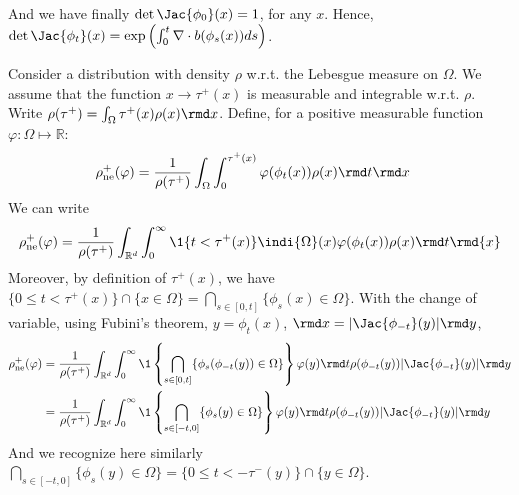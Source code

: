 And we have finally $ \det \Jac{\phi_0}(x) = 1$, for any $x$. Hence, $\det \Jac{\phi_t} (x) = \exp \left(\int_{0}^{t} \nabla \cdot b(\phi_s(x)) d s\right)$.


Consider a distribution with density $\rho$ w.r.t. the Lebesgue measure on $\Omega$. We assume that the function $x \to \tau^+(x)$ is measurable and integrable w.r.t. $\rho$.
Write $\rho(\tau^{+}) = \int_\Omega \tau^+(x) \rho(x) \rmd x$. 
Define, for a positive measurable function $\varphi:\Omega\mapsto \mathbb{R}$:
\begin{align*}
 \rho_{\mathrm{ne}}^{+}(\varphi) &=\frac{1}{\rho(\tau^{+})} \int_{\Omega} \int_{0}^{\tau^{+}({x})} \varphi(\phi_t(x))\rho({x})  \rmd t \rmd x 
\end{align*}
We can write
\begin{align*}
\rho_{\mathrm{ne}}^{+}(\varphi)  &=\frac{1}{\rho(\tau^{+})} \int_{\mathbb{R}^{d}} \int_{0}^{\infty}\1\{t< \tau^{+}( {x})\}\indi{\Omega}(x) \varphi(\phi_t(x))  \rho( {x}) \rmd t \rmd {x} \\
\end{align*}
Moreover, by definition of $\tau^{+}( {x})$, we have $\{0\leq t< \tau^{+}( {x})\}\cap\{x \in \Omega\} = \bigcap_{s \in [0,t]}\{\phi_s(x) \in \Omega\}$.
With the change of variable, using Fubini's theorem, $y = \phi_t(x)$, $\rmd x = |\Jac{\phi_{-t}}(y)| \rmd y$, 
\begin{align*}
\rho_{\mathrm{ne}}^{+}(\varphi)  &=\frac{1}{\rho(\tau^{+})} \int_{\mathbb{R}^{d}} \int_{0}^{\infty}\1\left\{\bigcap_{s \in [0,t]}\{\phi_s(\phi_{-t}(y)) \in \Omega\}\right\} \varphi(y) \rmd t \rho(\phi_{-t}(y)) |\Jac{\phi_{-t}}(y)| \rmd y\\
&=\frac{1}{\rho(\tau^{+})} \int_{\mathbb{R}^{d}} \int_{0}^{\infty}\1\left\{\bigcap_{s \in [-t,0]}\{\phi_s(y) \in \Omega\}\right\} \varphi(y) \rmd t \rho(\phi_{-t}(y)) |\Jac{\phi_{-t}}(y)| \rmd y
\end{align*}
And we recognize here similarly $\bigcap_{s \in [-t,0]}\{\phi_s(y) \in \Omega\} = \{0\leq t < - \tau^-(y)\} \cap \{y \in \Omega\}$.
